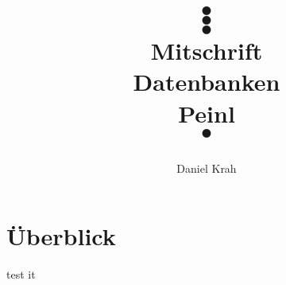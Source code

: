 \documentclass{article}
\title{
\color{white}
 $\bullet$ \\ $\bullet$ \\ $\bullet$ \\
 \color{black}
 \color{black}
 Mitschrift \\
Datenbanken \\
Peinl \\
\color{white}
$\bullet$ \\
\color{black}
 \begin{center}
\end{center}
}
\author{Daniel Krah}
\begin{document}
\maketitle%
\newpage%
 \tableofcontents%



%
% 







% 
\newpage
\section{Überblick}

test it


% 
% 



% 
% 
% 
% 

% 




% 
% 
% 
% 
% 
% 


% 






% 
% 
% 
% 
% 
% 
% 




%
\end{document}
